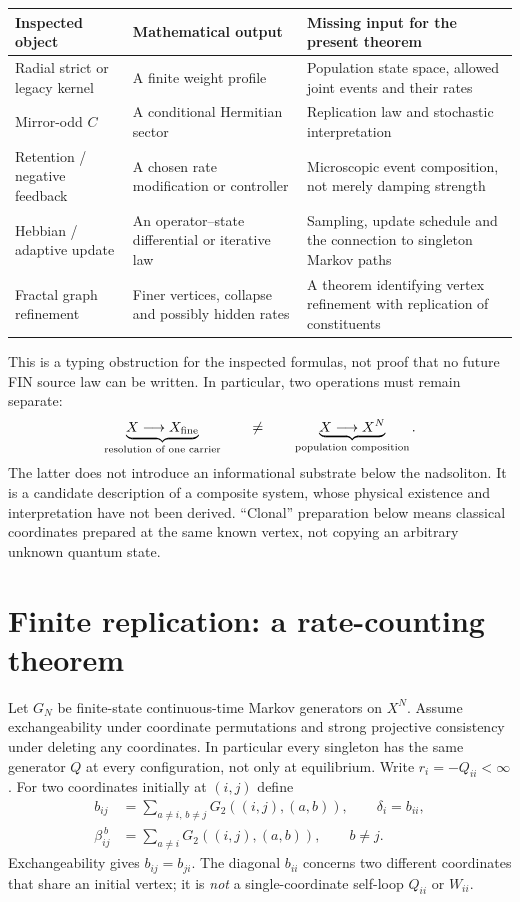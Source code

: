 \documentclass[11pt,a4paper]{article}
\begin{document}
\begin{longtable}{@{}p{}p{}p{}@{}}
\toprule Inspected object & Mathematical output & Missing input for the present theorem\\\midrule\endhead
Radial strict or legacy kernel & A finite weight profile & Population state
space, allowed joint events and their rates\\[1mm]
Mirror-odd $C$ & A conditional Hermitian sector & Replication law and
stochastic interpretation\\[1mm]
Retention / negative feedback & A chosen rate modification or controller &
Microscopic event composition, not merely damping strength\\[1mm]
Hebbian / adaptive update & An operator--state differential or iterative law &
Sampling, update schedule and the connection to singleton Markov paths\\[1mm]
Fractal graph refinement & Finer vertices, collapse and possibly hidden rates &
A theorem identifying vertex refinement with replication of constituents\\
\bottomrule
\end{longtable}

This is a typing obstruction for the inspected formulas, not proof that no
future FIN source law can be written. In particular, two operations must
remain separate:
\[
 \underbrace{X\longrightarrow X_{\rm fine}}_{\text{resolution of one carrier}}
 \qquad\ne\qquad
 \underbrace{X\longrightarrow X^N}_{\text{population composition}}.
\]
The latter does not introduce an informational substrate below the
nadsoliton. It is a candidate description of a composite system, whose
physical existence and interpretation have not been derived. ``Clonal''
preparation below means classical coordinates prepared at the same known
vertex, not copying an arbitrary unknown quantum state.

\section{Finite replication: a rate-counting theorem}

Let $G_N$ be finite-state continuous-time Markov generators on $X^N$.
Assume exchangeability under coordinate permutations and strong projective
consistency under deleting any coordinates. In particular every singleton
has the same generator $Q$ at every configuration, not only at equilibrium.
Write $r_i=-Q_{ii}<\infty$. For two coordinates initially at $(i,j)$ define
\begin{align}
 b_{ij}&=\sum_{a\ne i,\,b\ne j}
             G_2((i,j),(a,b)),\qquad \delta_i=b_{ii},\\
 \beta_{ij}^{\,b}&=\sum_{a\ne i}G_2((i,j),(a,b)),\qquad b\ne j.
\end{align}
Exchangeability gives $b_{ij}=b_{ji}$. The diagonal $b_{ii}$ concerns two
different coordinates that share an initial vertex; it is \emph{not} a
single-coordinate self-loop $Q_{ii}$ or $W_{ii}$.
\end{document}
